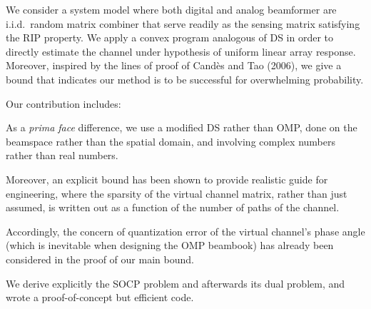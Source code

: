 \startsection [title={Contribution}]

We consider a system model where both digital and analog beamformer are i.i.d.\ random matrix combiner that serve readily as the sensing matrix satisfying the RIP property.
We apply a convex program analogous of DS in order to directly estimate the channel under hypothesis of uniform linear array response.
Moreover, inspired by the lines of proof of Cand\`es and Tao (2006), we give a bound that indicates our method is to be successful for overwhelming probability.

Our contribution includes:

\startitemize
\item As a {\it prima face} difference, we use a modified DS rather than OMP, done on the beamspace rather than the spatial domain, and involving complex numbers rather than real numbers.
\item Moreover, an explicit bound has been shown to provide realistic guide for engineering, where the sparsity of the virtual channel matrix, rather than just assumed, is written out as a function of the number of paths of the channel.
\item Accordingly, the concern of quantization error of the virtual channel's phase angle (which is inevitable when designing the OMP beambook) has already been considered in the proof of our main bound.
\item We derive explicitly the SOCP problem and afterwards its dual problem, and wrote a proof-of-concept but efficient code.
\stopitemize

\stopsection

\stopchapter

